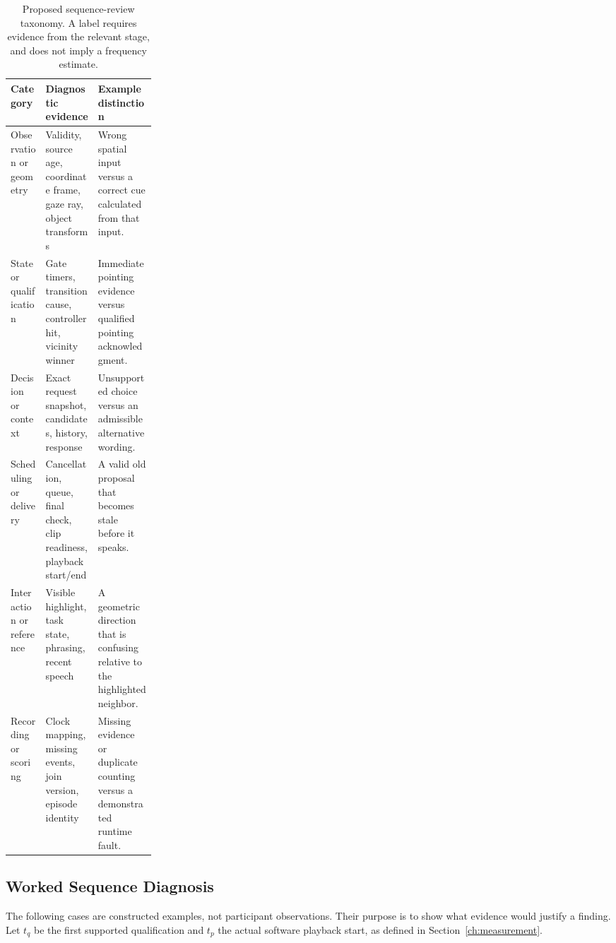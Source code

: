 \begin{table}[htbp]\centering
\caption[Failure categories and diagnostic evidence]{Proposed sequence-review taxonomy. A label requires evidence from the relevant stage, and does not imply a frequency estimate.}
\label{tab:failure-taxonomy}
\small{}
\begin{tabularx}{\linewidth}{@{}p{0.24\linewidth}XX@{}}\toprule
Category & Diagnostic evidence & Example distinction \\\midrule
Observation or geometry & Validity, source age, coordinate frame, gaze ray, object transforms & Wrong spatial input versus a correct cue calculated from that input. \\
State or qualification & Gate timers, transition cause, controller hit, vicinity winner & Immediate pointing evidence versus qualified pointing acknowledgment. \\
Decision or context & Exact request snapshot, candidates, history, response & Unsupported choice versus an admissible alternative wording. \\
Scheduling or delivery & Cancellation, queue, final check, clip readiness, playback start/end & A valid old proposal that becomes stale before it speaks. \\
Interaction or reference & Visible highlight, task state, phrasing, recent speech & A geometric direction that is confusing relative to the highlighted neighbor. \\
Recording or scoring & Clock mapping, missing events, join version, episode identity & Missing evidence or duplicate counting versus a demonstrated runtime fault. \\\bottomrule
\end{tabularx}
\end{table}

\subsection{Worked Sequence Diagnosis}
The following cases are constructed examples, not participant observations. Their purpose is to show what evidence would justify a finding. Let $t_q$ be the first supported qualification and $t_p$ the actual software playback start, as defined in Section~\ref{ch:measurement}.

